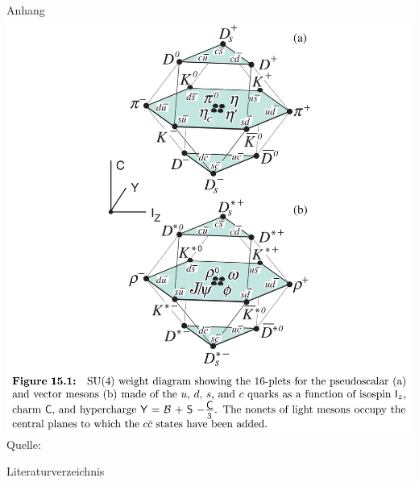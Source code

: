 \documentclass[aspectratio=169]{beamer} %
\newcommand{\figcite}[1]{\\[-3mm]{\tiny Quelle: \cite{#1}}}
\begin{document}
\begin{frame}{Anhang}
    \pagebreak
      \includegraphics[height=0.9\textheight, width=\linewidth, keepaspectratio]{Images/90f0590a-0e4a-4d62-bd40-0bcce4be9feb.jpg}%
      \figcite{C.Amsler.2017}
    
    \end{frame}


    
    \begin{frame}{Literaturverzeichnis}
   \printbibliography%
    \end{frame}
\end{document}
